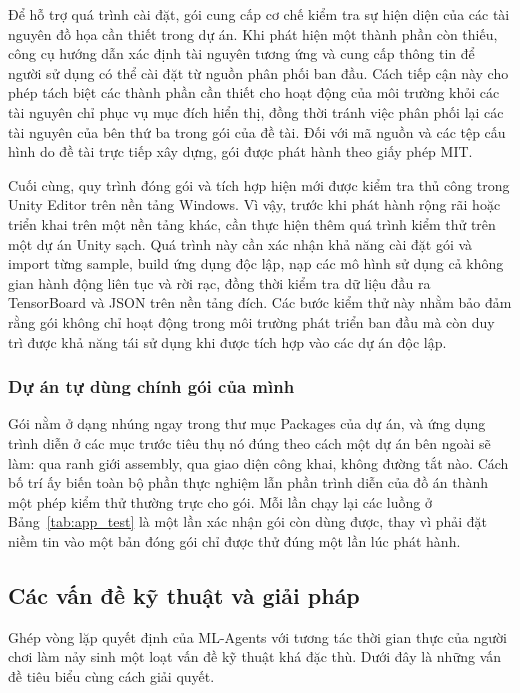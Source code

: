 \indent Để hỗ trợ quá trình cài đặt, gói cung cấp cơ chế kiểm tra sự hiện diện của các tài nguyên đồ họa cần thiết trong dự án. Khi phát hiện một thành phần còn thiếu, công cụ hướng dẫn xác định tài nguyên tương ứng và cung cấp thông tin để người sử dụng có thể cài đặt từ nguồn phân phối ban đầu. Cách tiếp cận này cho phép tách biệt các thành phần cần thiết cho hoạt động của môi trường khỏi các tài nguyên chỉ phục vụ mục đích hiển thị, đồng thời tránh việc phân phối lại các tài nguyên của bên thứ ba trong gói của đề tài. Đối với mã nguồn và các tệp cấu hình do đề tài trực tiếp xây dựng, gói được phát hành theo giấy phép MIT.

\indent Cuối cùng, quy trình đóng gói và tích hợp hiện mới được kiểm tra thủ công trong Unity Editor trên nền tảng Windows. Vì vậy, trước khi phát hành rộng rãi hoặc triển khai trên một nền tảng khác, cần thực hiện thêm quá trình kiểm thử trên một dự án Unity sạch. Quá trình này cần xác nhận khả năng cài đặt gói và import từng sample, build ứng dụng độc lập, nạp các mô hình sử dụng cả không gian hành động liên tục và rời rạc, đồng thời kiểm tra dữ liệu đầu ra TensorBoard và JSON trên nền tảng đích. Các bước kiểm thử này nhằm bảo đảm rằng gói không chỉ hoạt động trong môi trường phát triển ban đầu mà còn duy trì được khả năng tái sử dụng khi được tích hợp vào các dự án độc lập.


\subsubsection{Dự án tự dùng chính gói của mình}

\indent Gói nằm ở dạng nhúng ngay trong thư mục Packages của dự án, và ứng dụng
trình diễn ở các mục trước tiêu thụ nó đúng theo cách một dự án bên ngoài sẽ làm: qua ranh
giới assembly, qua giao diện công khai, không đường tắt nào. Cách bố trí ấy biến toàn bộ
phần thực nghiệm lẫn phần trình diễn của đồ án thành một phép kiểm thử thường trực cho
gói. Mỗi lần chạy lại các luồng ở Bảng~\ref{tab:app_test} là một lần xác nhận gói còn dùng
được, thay vì phải đặt niềm tin vào một bản đóng gói chỉ được thử đúng một lần lúc phát
hành.

\subsection{Các vấn đề kỹ thuật và giải pháp}
\label{sub:app-issues}

\indent Ghép vòng lặp quyết định của ML-Agents với tương tác thời gian thực của người chơi
làm nảy sinh một loạt vấn đề kỹ thuật khá đặc thù. Dưới đây là những vấn đề tiêu biểu cùng
cách giải quyết.

